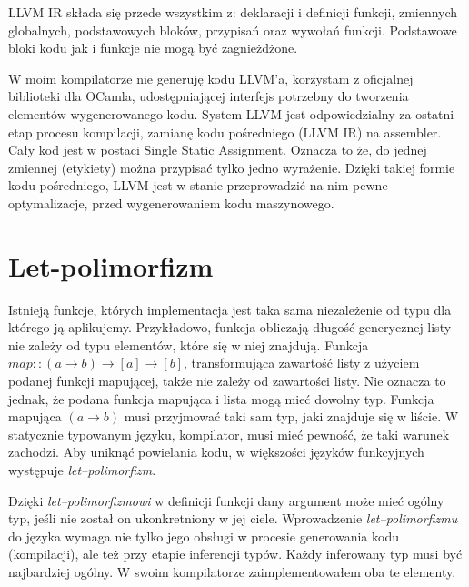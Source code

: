 \documentclass[declaration,shortabstract]{iithesis}
\begin{document}
LLVM IR składa się przede wszystkim z: deklaracji i definicji funkcji, zmiennych globalnych, 
podstawowych bloków, przypisań oraz wywołań funkcji. Podstawowe bloki kodu jak i funkcje nie 
mogą być zagnieżdżone. 

W moim kompilatorze nie generuję kodu LLVM'a, korzystam z oficjalnej biblioteki dla OCamla, 
udostępniającej interfejs potrzebny do tworzenia elementów wygenerowanego kodu. System LLVM 
jest odpowiedzialny za ostatni etap procesu kompilacji, zamianę kodu pośredniego (LLVM IR) 
na assembler. Cały kod jest w postaci Single Static Assignment. Oznacza to że, 
do jednej zmiennej (etykiety) można przypisać tylko jedno wyrażenie. 
Dzięki takiej formie kodu pośredniego, LLVM jest w 
stanie przeprowadzić na nim pewne optymalizacje, przed wygenerowaniem kodu 
maszynowego. 



\section{Let-polimorfizm}

Istnieją funkcje, których implementacja jest taka sama niezależenie od typu dla
którego ją aplikujemy. Przykładowo, funkcja obliczają długość generycznej 
listy nie zależy od typu elementów, które się w niej znajdują. 
Funkcja $map :: (a \rightarrow b) \rightarrow [a] \rightarrow [b]$, 
transformująca zawartość listy 
z użyciem podanej funkcji mapującej, także nie zależy od zawartości listy. Nie 
oznacza to jednak, że podana funkcja mapująca i lista mogą mieć dowolny typ. 
Funkcja mapująca $(a \rightarrow b)$ musi przyjmować taki sam typ, jaki 
znajduje się w liście. W statycznie typowanym języku, kompilator, musi mieć 
pewność, że taki warunek zachodzi. Aby uniknąć powielania kodu, w większości 
języków funkcyjnych 
występuje \textit{let--polimorfizm}. 

Dzięki \textit{let--polimorfizmowi} w definicji funkcji dany argument może 
mieć ogólny typ, jeśli nie został on ukonkretniony w jej ciele.
Wprowadzenie \textit{let--polimorfizmu} do języka wymaga nie tylko jego obsługi 
w procesie generowania kodu (kompilacji), ale też przy etapie inferencji typów.
Każdy inferowany typ musi być najbardziej ogólny. W swoim kompilatorze 
zaimplementowałem oba te elementy. 
\end{document}
